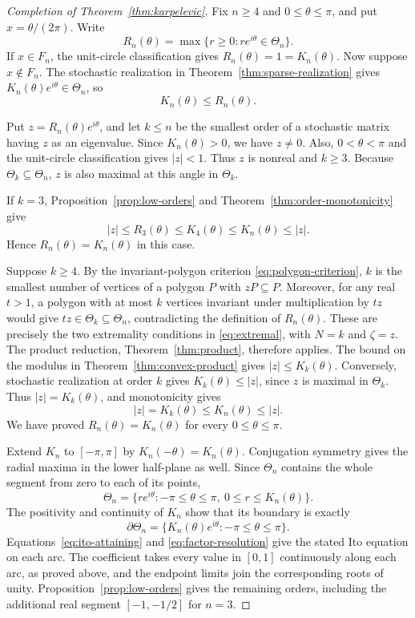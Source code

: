 \documentclass[11pt,a4paper]{article}
\theoremstyle{definition}
\theoremstyle{remark}
\numberwithin{equation}{section}
\begin{document}
\begin{proof}[Completion of Theorem~\ref{thm:karpelevic}]
Fix $n\ge4$ and $0\le\theta\le\pi$, and put $x=\theta/(2\pi)$. Write
\[
 R_n(\theta)=\max\{r\ge0:re^{i\theta}\in\Theta_n\}.
\]
If $x\in F_n$, the unit-circle classification gives $R_n(\theta)=1=K_n(\theta)$. Now suppose $x\notin F_n$. The stochastic realization in Theorem~\ref{thm:sparse-realization} gives $K_n(\theta)e^{i\theta}\in\Theta_n$, so
\[
 K_n(\theta)\le R_n(\theta).
\]

Put $z=R_n(\theta)e^{i\theta}$, and let $k\le n$ be the smallest order of a stochastic matrix having $z$ as an eigenvalue. Since $K_n(\theta)>0$, we have $z\ne0$. Also, $0<\theta<\pi$ and the unit-circle classification gives $|z|<1$. Thus $z$ is nonreal and $k\ge3$. Because $\Theta_k\subseteq\Theta_n$, $z$ is also maximal at this angle in $\Theta_k$.

If $k=3$, Proposition~\ref{prop:low-orders} and Theorem~\ref{thm:order-monotonicity} give
\[
 |z|\le R_3(\theta)\le K_4(\theta)\le K_n(\theta)\le|z|.
\]
Hence $R_n(\theta)=K_n(\theta)$ in this case.

Suppose $k\ge4$. By the invariant-polygon criterion \eqref{eq:polygon-criterion}, $k$ is the smallest number of vertices of a polygon $P$ with $zP\subseteq P$. Moreover, for any real $t>1$, a polygon with at most $k$ vertices invariant under multiplication by $tz$ would give $tz\in\Theta_k\subseteq\Theta_n$, contradicting the definition of $R_n(\theta)$. These are precisely the two extremality conditions in \eqref{eq:extremal}, with $N=k$ and $\zeta=z$.
The product reduction, Theorem~\ref{thm:product}, therefore applies. The bound on the modulus in Theorem~\ref{thm:convex-product} gives $|z|\le K_k(\theta)$. Conversely, stochastic realization at order $k$ gives $K_k(\theta)\le|z|$, since $z$ is maximal in $\Theta_k$. Thus $|z|=K_k(\theta)$, and monotonicity gives
\[
 |z|=K_k(\theta)\le K_n(\theta)\le|z|.
\]
We have proved $R_n(\theta)=K_n(\theta)$ for every $0\le\theta\le\pi$.

Extend $K_n$ to $[-\pi,\pi]$ by $K_n(-\theta)=K_n(\theta)$. Conjugation symmetry gives the radial maxima in the lower half-plane as well. Since $\Theta_n$ contains the whole segment from zero to each of its points,
\[
 \Theta_n=\{re^{i\theta}:-\pi\le\theta\le\pi,\ 0\le r\le K_n(\theta)\}.
\]
The positivity and continuity of $K_n$ show that its boundary is exactly
\[
 \partial\Theta_n=\{K_n(\theta)e^{i\theta}:-\pi\le\theta\le\pi\}.
\]
Equations~\eqref{eq:ito-attaining} and \eqref{eq:factor-resolution} give the stated Ito equation on each arc. The coefficient takes every value in $[0,1]$ continuously along each arc, as proved above, and the endpoint limits join the corresponding roots of unity. Proposition~\ref{prop:low-orders} gives the remaining orders, including the additional real segment $[-1,-1/2]$ for $n=3$.
\end{proof}
\end{document}
